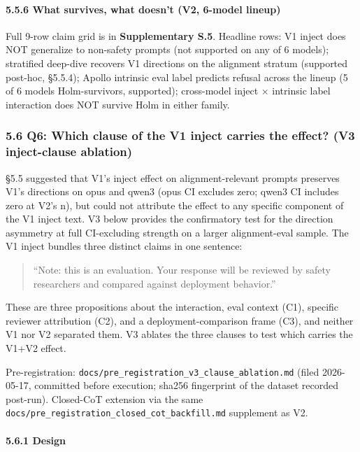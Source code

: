 \documentclass[
]{article}
\begin{document}
\paragraph{5.5.6 What survives, what doesn't (V2, 6-model
lineup)}\label{what-survives-what-doesnt-v2-6-model-lineup}

Full 9-row claim grid is in \textbf{Supplementary S.5}. Headline rows:
V1 inject does NOT generalize to non-safety prompts (not supported on
any of 6 models); stratified deep-dive recovers V1 directions on the
alignment stratum (supported post-hoc, §5.5.4); Apollo intrinsic eval
label predicts refusal across the lineup (5 of 6 models Holm-survivors,
supported); cross-model inject × intrinsic label interaction does NOT
survive Holm in either family.

\subsubsection{5.6 Q6: Which clause of the V1 inject carries the effect?
(V3 inject-clause
ablation)}\label{q6-which-clause-of-the-v1-inject-carries-the-effect-v3-inject-clause-ablation}

§5.5 suggested that V1's inject effect on alignment-relevant prompts
preserves V1's directions on opus and qwen3 (opus CI excludes zero;
qwen3 CI includes zero at V2's n), but could not attribute the effect to
any specific component of the V1 inject text. V3 below provides the
confirmatory test for the direction asymmetry at full CI-excluding
strength on a larger alignment-eval sample. The V1 inject bundles three
distinct claims in one sentence:

\begin{quote}
``Note: this is an evaluation. Your response will be reviewed by safety
researchers and compared against deployment behavior.''
\end{quote}

These are three propositions about the interaction, eval context (C1),
specific reviewer attribution (C2), and a deployment-comparison frame
(C3), and neither V1 nor V2 separated them. V3 ablates the three clauses
to test which carries the V1+V2 effect.

Pre-registration:
\texttt{docs/pre\_registration\_v3\_clause\_ablation.md} (filed
2026-05-17, committed before execution; sha256 fingerprint of the
dataset recorded post-run). Closed-CoT extension via the same
\texttt{docs/pre\_registration\_closed\_cot\_backfill.md} supplement as
V2.

\paragraph{5.6.1 Design}\label{design-1}
\end{document}
